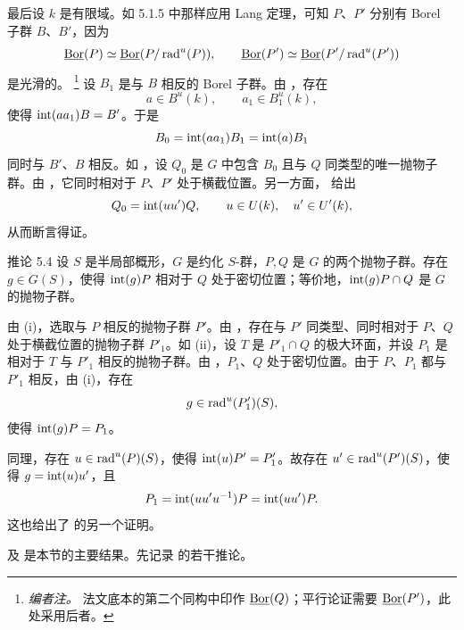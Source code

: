 最后设 \(k\) 是有限域。如 5.1.5 中那样应用 Lang 定理，可知 \(P\)、\(P'\) 分别有 Borel 子群 \(B\)、\(B'\)，因为
\[
 \underline{\operatorname{Bor}}(P)\simeq\underline{\operatorname{Bor}}(P/\operatorname{rad}^u(P)),\qquad
 \underline{\operatorname{Bor}}(P')\simeq\underline{\operatorname{Bor}}(P'/\operatorname{rad}^u(P'))
\]
是光滑的。
\footnote{\emph{编者注。} 法文底本的第二个同构中印作 \(\underline{\operatorname{Bor}}(Q)\)；平行论证需要 \(\underline{\operatorname{Bor}}(P')\)，此处采用后者。}
设 \(B_1\) 是与 \(B\) 相反的 Borel 子群。由 ，存在
\[
 a\in B^u(k),\qquad a_1\in B_1^u(k),
\]
使得 \(\operatorname{int}(aa_1)B=B'\)。于是
\[
 B_0=\operatorname{int}(aa_1)B_1=\operatorname{int}(a)B_1
\]
同时与 \(B'\)、\(B\) 相反。如 ，设 \(Q_0\) 是 \(G\) 中包含 \(B_0\) 且与 \(Q\) 同类型的唯一抛物子群。由 \textup{}，它同时相对于 \(P\)、\(P'\) 处于横截位置。另一方面， 给出
\[
 Q_0=\operatorname{int}(uu')Q,\qquad u\in U(k),\quad u'\in U'(k),
\]
从而断言得证。

\begin{sgastatement}{推论 5.4}
设 \(S\) 是半局部概形，\(G\) 是约化 \(S\)-群，\(P,Q\) 是 \(G\) 的两个抛物子群。存在 \(g\in G(S)\)，使得 \(\operatorname{int}(g)P\) 相对于 \(Q\) 处于密切位置；等价地，\(\operatorname{int}(g)P\cap Q\) 是 \(G\) 的抛物子群。
\end{sgastatement}

由 \textup{(i)}，选取与 \(P\) 相反的抛物子群 \(P'\)。由 ，存在与 \(P'\) 同类型、同时相对于 \(P\)、\(Q\) 处于横截位置的抛物子群 \(P'_1\)。如 \textup{(ii)}，设 \(T\) 是 \(P'_1\cap Q\) 的极大环面，并设 \(P_1\) 是相对于 \(T\) 与 \(P'_1\) 相反的抛物子群。由 ，\(P_1\)、\(Q\) 处于密切位置。由于 \(P\)、\(P_1\) 都与 \(P'_1\) 相反，由 \textup{(i)}，存在
\[
 g\in\operatorname{rad}^u(P'_1)(S),
\]
使得 \(\operatorname{int}(g)P=P_1\)。
\SGAQED

同理，存在 \(u\in\operatorname{rad}^u(P)(S)\)，使得 \(\operatorname{int}(u)P'=P'_1\)。故存在 \(u'\in\operatorname{rad}^u(P')(S)\)，使得 \(g=\operatorname{int}(u)u'\)，且
\[
 P_1=\operatorname{int}(uu'u^{-1})P=\operatorname{int}(uu')P.
\]
这也给出了  的另一个证明。

 及  是本节的主要结果。先记录  的若干推论。

